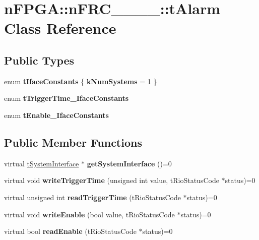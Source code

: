 \hypertarget{classnFPGA_1_1nFRC__2012__1__6__4_1_1tAlarm}{
\section{nFPGA::nFRC\_\_\_\_::tAlarm Class Reference}
\label{classnFPGA_1_1nFRC__2012__1__6__4_1_1tAlarm}
}
\subsection*{Public Types}
\begin{DoxyCompactItemize}
\item 
enum {\bfseries tIfaceConstants} \{ {\bfseries kNumSystems} =  1
 \}
\item 
enum {\bfseries tTriggerTime\_\-IfaceConstants} 
\item 
enum {\bfseries tEnable\_\-IfaceConstants} 
\end{DoxyCompactItemize}
\subsection*{Public Member Functions}
\begin{DoxyCompactItemize}
\item 
\hypertarget{classnFPGA_1_1nFRC__2012__1__6__4_1_1tAlarm_a949bc7ab5ed01310c45f7bdacb7e5998}{
virtual \hyperlink{classnFPGA_1_1tSystemInterface}{tSystemInterface} $\ast$ {\bfseries getSystemInterface} ()=0}
\label{classnFPGA_1_1nFRC__2012__1__6__4_1_1tAlarm_a949bc7ab5ed01310c45f7bdacb7e5998}

\item 
\hypertarget{classnFPGA_1_1nFRC__2012__1__6__4_1_1tAlarm_a872a6a47d7782b732c4f499599863859}{
virtual void {\bfseries writeTriggerTime} (unsigned int value, tRioStatusCode $\ast$status)=0}
\label{classnFPGA_1_1nFRC__2012__1__6__4_1_1tAlarm_a872a6a47d7782b732c4f499599863859}

\item 
\hypertarget{classnFPGA_1_1nFRC__2012__1__6__4_1_1tAlarm_af1d77a3a388804cde52c71534515f367}{
virtual unsigned int {\bfseries readTriggerTime} (tRioStatusCode $\ast$status)=0}
\label{classnFPGA_1_1nFRC__2012__1__6__4_1_1tAlarm_af1d77a3a388804cde52c71534515f367}

\item 
\hypertarget{classnFPGA_1_1nFRC__2012__1__6__4_1_1tAlarm_aa05885f5455bdbe4396555994073aced}{
virtual void {\bfseries writeEnable} (bool value, tRioStatusCode $\ast$status)=0}
\label{classnFPGA_1_1nFRC__2012__1__6__4_1_1tAlarm_aa05885f5455bdbe4396555994073aced}

\item 
\hypertarget{classnFPGA_1_1nFRC__2012__1__6__4_1_1tAlarm_abc0f1d934e5f379cc7ce98777021ba20}{
virtual bool {\bfseries readEnable} (tRioStatusCode $\ast$status)=0}
\label{classnFPGA_1_1nFRC__2012__1__6__4_1_1tAlarm_abc0f1d934e5f379cc7ce98777021ba20}

\end{DoxyCompactItemize}
